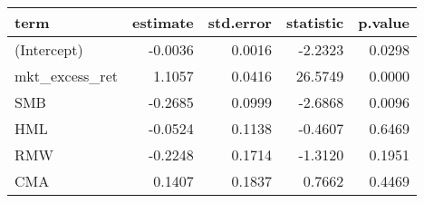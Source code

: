 \begin{table}[ht]
\centering
\begin{tabular}{lrrrr}
  \hline
term & estimate & std.error & statistic & p.value \\ 
  \hline
(Intercept) & -0.0036 & 0.0016 & -2.2323 & 0.0298 \\ 
  mkt\_excess\_ret & 1.1057 & 0.0416 & 26.5749 & 0.0000 \\ 
  SMB & -0.2685 & 0.0999 & -2.6868 & 0.0096 \\ 
  HML & -0.0524 & 0.1138 & -0.4607 & 0.6469 \\ 
  RMW & -0.2248 & 0.1714 & -1.3120 & 0.1951 \\ 
  CMA & 0.1407 & 0.1837 & 0.7662 & 0.4469 \\ 
   \hline
\end{tabular}
\end{table}

